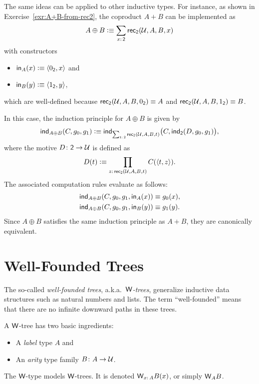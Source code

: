 \begin{rem}
    The same ideas can be applied to other inductive types. For instance, as shown in Exercise~\ref{exr:A+B-from-rec2}, the coproduct $A+B$ can be implemented as
    \[
        A\oplus B\defeq\sum_{x\colon\fun2}
            \fun{rec}_{\fun2}(\univ,A,B,x)
    \]
    with constructors
    \begin{itemize}
        \item $\mathsf{in}_A(x)\mathrel{\vcentcolon}\equiv\langle0_{\mathsf{2}},x\rangle$ and
        \item $\mathsf{in}_B(y)\mathrel{\vcentcolon}\equiv\langle1_{\mathsf{2}},y\rangle$,
    \end{itemize}
    which are well-defined because $\mathsf{rec}_{\mathsf{2}}(\mathcal U,A,B,0_{\mathsf{2}})\equiv A$ and $\mathsf{rec}_{\mathsf{2}}(\mathcal U,A,B,1_{\mathsf{2}})\equiv B$.
    
    In this case, the induction principle for $A\oplus B$ is given by
    \[
        \fun{ind}_{A\oplus B}(C,g_0,g_1)
        \defeq
        \fun{ind}_{\sum_{t\colon\fun2}\fun{rec}_{\fun2}(\univ,A,B,t)}
        \bigl(
            C,
            \fun{ind}_{\fun2}(D,g_0,g_1)
        \bigr),
    \]
    where the motive $D\colon\fun2\to\univ$ is defined as
    \[
        D(t)\defeq\prod_{z\colon\fun{rec}_{\fun2}(\univ,A,B,t)}C(\dep{t,z}).
    \]
    The associated computation rules evaluate as follows:
    \begin{align*}
        \mathsf{ind}_{A\oplus B}(C,g_0,g_1,\mathsf{in}_A(x)) &\equiv g_0(x),\\
        \mathsf{ind}_{A\oplus B}(C,g_0,g_1,\mathsf{in}_B(y)) &\equiv g_1(y).
    \end{align*}
    Since $A\oplus B$ satisfies the same induction principle as $A+B$, they are canonically equivalent.
\end{rem}

\section{Well-Founded Trees}

The so-called \textsl{well-founded trees}, a.k.a.~\textsl{$\mathsf{W}$-trees}, generalize inductive data structures such as natural numbers and lists. The term ``well-founded'' means that there are no infinite downward paths in these trees.

A $\mathsf{W}$-tree has two basic ingredients:
\begin{itemize}
    \item A \textsl{label} type $A$ and
    \item An \textsl{arity} type family $B\colon A\to\univ$.
\end{itemize}
The $\mathsf{W}$-type models $\mathsf{W}$-trees. It is denoted $\fun W_{x\colon A}B(x)$, or simply $\mathsf{W}_AB$.

